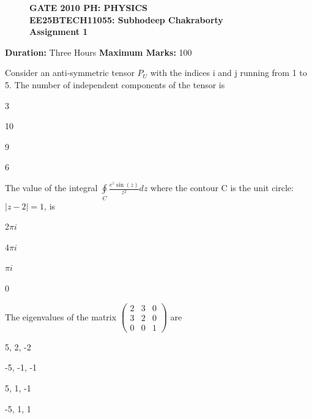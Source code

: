 \documentclass{exam}
\begin{document}
\begin{figure}[H] \centering
	\textbf{GATE 2010 PH: PHYSICS} \\
	\textbf{EE25BTECH11055: Subhodeep Chakraborty} \\
	\textbf{Assignment 1}
\end{figure}

\noindent\textbf{Duration:} Three Hours \hfill \textbf{Maximum Marks:} 100

\hrulefill

\begin{questions}
\question Consider an anti-symmetric tensor $P_{U}$ with the indices i and j running from 1 to 5. The number of independent components of the tensor is \hfill{}


\begin{enumerate} \begin{multicols}{4}
	\item 3 \item 10 \item 9 \item 6
\end{multicols} \end{enumerate}

\question The value of the integral $\oint\limits_{C}\frac{e^{z}\sin(z)}{z^{2}}dz$ where the contour C is the unit circle: $|z-2|=1$, is\hfill{}


\begin{enumerate} \begin{multicols}{4}
	\item 2$\pi i$ \item 4$\pi i$ \item $\pi i$ \item 0
\end{multicols} \end{enumerate}

\question The eigenvalues of the matrix $\begin{pmatrix} 2 & 3 & 0 \\ 3 & 2 & 0 \\ 0 & 0 & 1 \end{pmatrix}$ are\hfill{}


\begin{enumerate} \begin{multicols}{4}
	\item 5, 2, -2 \item -5, -1, -1 \item 5, 1, -1 \item -5, 1, 1
\end{multicols} \end{enumerate}


\end{questions}
\end{document}
